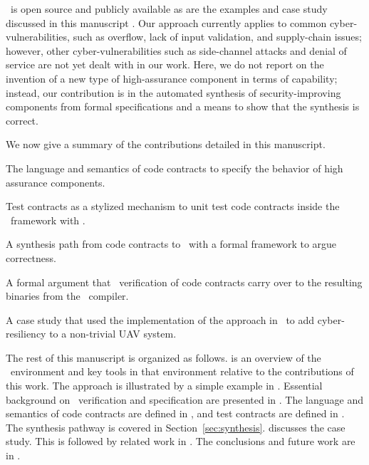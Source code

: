 \brfcs\ is open source and publicly available \cite{fmide} as are the examples and case study discussed in this manuscript \cite{repo, phase2, camkes, case}.
Our approach currently applies to common cyber-vulnerabilities, such
as overflow, lack of input validation, and supply-chain issues;
however, other cyber-vulnerabilities such as side-channel attacks and
denial of service are not yet dealt with in our work.  Here, we do not
report on the invention of a new type of high-assurance component in
terms of capability; instead, our contribution is in the automated
synthesis of security-improving components from formal specifications
and a means to show that the synthesis is correct.

We now give a summary of the contributions detailed in this
manuscript.
\begin{compactitem}
  \item The language and semantics of code contracts to specify the behavior of high assurance components.
  \item Test contracts as a stylized mechanism to unit test code contracts inside the \brfcs\ framework with \agr.
  \item A synthesis path from code contracts to \ckml\ with a formal framework to argue correctness.
  \item A formal argument that \agr\ verification of code contracts carry over to the resulting binaries from the \ckml\ compiler.
  \item A case study that used the implementation of the approach in \brfcs\ to add cyber-resiliency to a non-trivial UAV system.
\end{compactitem}
The rest of this manuscript is organized as follows.
 is an overview of the \brfcs\ environment and key tools in that environment relative to the contributions of this work. The approach is illustrated by a simple example in
. Essential background on \agr\ verification and specification are
presented in .
The language and semantics of code contracts are defined in , and test contracts are defined in .
The synthesis pathway is covered in Section~\ref{sec:synthesis}.
 discusses the case study.
This is followed by related work in .
The conclusions and future work are in .

